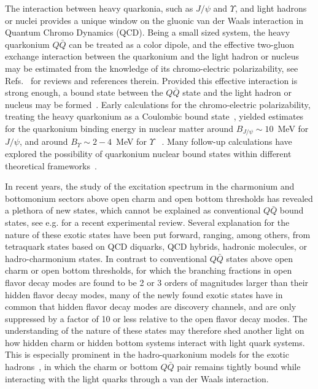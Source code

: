 \documentclass[prd,amsmath,%
twocolumn,floatfix,amssymb, preprintnumbers, linenumbers,nofootinbib, superscriptaddress]{revtex4}
\begin{document}
The interaction between heavy quarkonia, such as $J/\psi$ and $\Upsilon$, and light hadrons or nuclei provides a unique window on the gluonic van der Waals interaction in Quantum Chromo Dynamics (QCD). Being a small sized system, the heavy quarkonium $Q \bar Q$ can be treated as a color dipole, and the effective two-gluon exchange interaction between the quarkonium and the light hadron  or nucleus may be estimated from the knowledge of its chromo-electric polarizability, see 
Refs.~\cite{Kharzeev:1995ij,Voloshin:2007dx,Hosaka:2016ypm} for reviews and references therein. 
Provided this effective interaction is strong enough, 
a bound state between the
$Q \bar Q$ state and the light hadron or  nucleus may be formed~\cite{Brodsky:1989jd, Wasson:1991fb, Luke:1992tm}. 
Early calculations for the chromo-electric polarizability,  treating the heavy quarkonium as a Coulombic bound state~\cite{Peskin:1979va,Bhanot:1979vb}, 
yielded estimates for the quarkonium binding energy in 
nuclear matter around $B_{J/\psi} \sim 10$~MeV for $J/\psi$,  and around $B_{\Upsilon} \sim 2 - 4$~MeV for $\Upsilon$ ~\cite{Luke:1992tm}. Many follow-up calculations have explored the possibility of quarkonium nuclear bound states within different theoretical  frameworks~\cite{Brodsky:1997gh, Ko:2000jx, Tsushima:2011kh, Yokota:2013sfa, Beane:2014sda, Krein:2019gcm}. 

In recent years, the study of the excitation spectrum in the charmonium and bottomonium sectors above open charm and  open bottom thresholds has revealed a plethora of new  states, which cannot be explained as conventional $Q \bar Q$ bound states, see e.g. \cite{Olsen:2017bmm} for a recent experimental review. Several explanation for the nature of these exotic states have been put forward, ranging, among others, from tetraquark states based on QCD diquarks, QCD hybrids, hadronic molecules, or hadro-charmonium states. In contrast to conventional $Q \bar Q$ states above open charm or open bottom thresholds, for which the branching fractions in open flavor decay modes are found to be 2 or 3 orders of magnitudes larger than their hidden flavor decay modes, many of the newly found exotic states have in common that hidden flavor decay modes are discovery channels, and are only suppressed by a factor of 10 or less relative to the open flavor 
decay modes. The understanding of the nature of these states may therefore shed another light on how hidden charm or hidden bottom systems interact with light quark systems. This is especially prominent in the hadro-quarkonium models for the exotic hadrons~\cite{Dubynskiy:2008mq}, in which 
the charm or bottom $Q \bar Q$ pair remains tightly bound while interacting with the light quarks through a van der Waals interaction.
\end{document}
